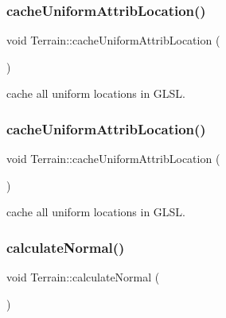 \subsubsection{\texorpdfstring{cache\+Uniform\+Attrib\+Location()}{cacheUniformAttribLocation()}\hspace{0.1cm}{\footnotesize\ttfamily [1/2]}}
{\footnotesize\ttfamily void Terrain\+::cache\+Uniform\+Attrib\+Location (\begin{DoxyParamCaption}{ }\end{DoxyParamCaption})\hspace{0.3cm}{\ttfamily [protected]}}

cache all uniform locations in G\+L\+SL. \mbox{\label{classTerrain_a33ce1e6fa0fff42e42f510d29553e015}} 
\subsubsection{\texorpdfstring{cache\+Uniform\+Attrib\+Location()}{cacheUniformAttribLocation()}\hspace{0.1cm}{\footnotesize\ttfamily [2/2]}}
{\footnotesize\ttfamily void Terrain\+::cache\+Uniform\+Attrib\+Location (\begin{DoxyParamCaption}{ }\end{DoxyParamCaption})\hspace{0.3cm}{\ttfamily [protected]}}

cache all uniform locations in G\+L\+SL. \mbox{\label{classTerrain_a04237c044acd2918422e7654e18cd89b}} 
\subsubsection{\texorpdfstring{calculate\+Normal()}{calculateNormal()}\hspace{0.1cm}{\footnotesize\ttfamily [1/2]}}
{\footnotesize\ttfamily void Terrain\+::calculate\+Normal (\begin{DoxyParamCaption}{ }\end{DoxyParamCaption})\hspace{0.3cm}{\ttfamily [protected]}}

